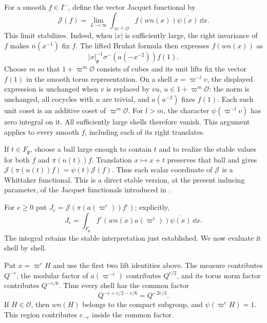 For a smooth \(f\in I^-\), define the vector Jacquet functional by
\[
 \mathscr J(f)=\lim_{L\to\infty}
   \int_{\varpi^{-L}\mathcal O}f(wn(x))\overline{\psi(x)}\,\dd x.
\]
This limit stabilizes.  Indeed, when \(|x|\) is sufficiently large,
the right invariance of \(f\) makes \(\bar n(x^{-1})\) fix \(f\).
The lifted Bruhat formula then expresses \(f(wn(x))\) as
\[
 |x|_{\mathfrak p}^{-1}
       \sigma^-(a(-x^{-2}))f(1).
\]
Choose \(m\) so that \(1+\varpi^m\mathcal O\) consists of cubes and
its unit lifts fix the vector \(f(1)\) in the smooth torus
representation.  On a shell \(x=\varpi^{-l}v\), the displayed
expression is unchanged when \(v\) is replaced by
\(vu\), \(u\in1+\varpi^m\mathcal O\): the norm is unchanged, all
cocycles with \(u\) are trivial, and \(a(u^{-2})\) fixes \(f(1)\).
Each such unit coset is an additive coset of
\(\varpi^m\mathcal O\).  For \(l>m\), the character
\(\psi(\varpi^{-l}v)\) has zero integral on it.  All sufficiently
large shells therefore vanish.  This argument applies to every
smooth \(f\), including each of its right translates.

If \(t\in F_{\mathfrak p}\), choose a ball large enough to contain
\(t\) and to realize the stable values for both \(f\) and
\(\pi(n(t))f\).  Translation \(x\mapsto x+t\) preserves that ball
and gives
\(\mathscr J(\pi(n(t))f)=\psi(t)\mathscr J(f)\).
Thus each scalar coordinate of \(\mathscr J\) is a Whittaker functional.
This is a direct stable version, at the present inducing parameter,
of the Jacquet functionals introduced in
\cite[Section~I.3, pp.~74--75]{KP84}.

For \(e\ge0\) put \(J_e=\mathscr J(\pi(a(\varpi^e))f^\circ)\); explicitly,
\begin{equation}\label{eq:app-Jacquet}
 J_e=\int_{F_{\mathfrak p}}
        f^\circ(wn(x)a(\varpi^e))\overline{\psi(x)}\,\dd x.
\end{equation}
The integral retains the stable interpretation just established.
We now evaluate it shell by shell.

Put \(x=\varpi^eH\) and use the first two lift identities above.
The measure contributes \(Q^{-e}\), the modular factor of
\(a(\varpi^{-e})\) contributes \(Q^{e/2}\), and its torus norm
factor contributes \(Q^{-e/6}\).  Thus every shell has the common
factor
\begin{equation}\label{eq:app-common-factor}
 Q^{-e+e/2-e/6}=Q^{-2e/3}.
\end{equation}
If \(H\in\mathcal O\), then \(wn(H)\) belongs to the compact
subgroup, and \(\psi(\varpi^eH)=1\).  This region contributes
\(e_{-e}\) inside the common factor.


